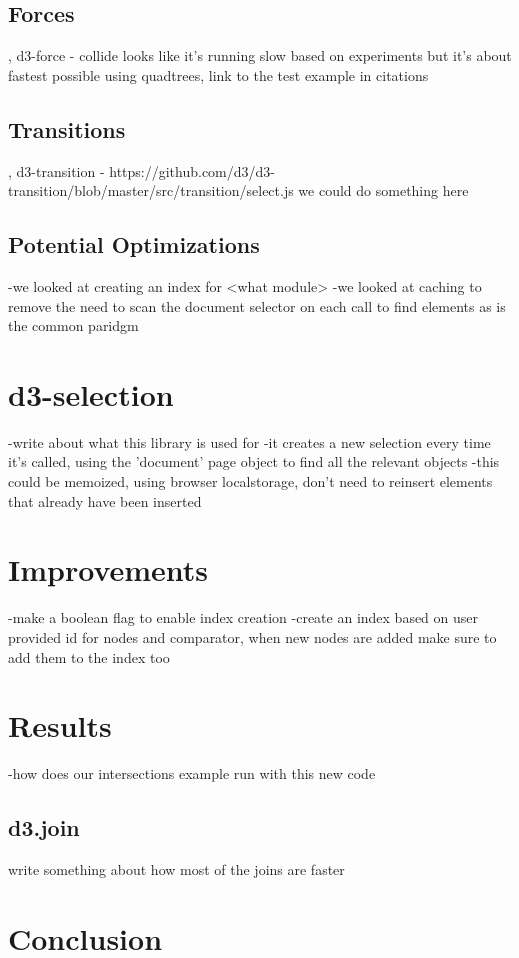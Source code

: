 \documentclass[a4paper]{article}
\begin{document}
\subsection{Forces}, d3-force - collide looks like it's running slow based on experiments but it's about fastest possible using quadtrees, link to the test example in citations

\subsection{Transitions}, d3-transition - https://github.com/d3/d3-transition/blob/master/src/transition/select.js we could do something here

\subsection{Potential Optimizations}
-we looked at creating an index for <what module>
-we looked at caching to remove the need to scan the document selector on each call to find elements as is the common paridgm
\section{d3-selection}
-write about what this library is used for
-it creates a new selection every time it's called, using the 'document' page object to find all the relevant objects
-this could be memoized, using browser localstorage, don't need to reinsert elements that already have been inserted
\section{Improvements}
-make a boolean flag to enable index creation
-create an index based on user provided id for nodes and comparator, when new nodes are added make sure to add them to the index too
\section{Results}
-how does our intersections example run with this new code

\subsection{d3.join}
write something about how most of the joins are faster
\section{Conclusion}
\end{document}
